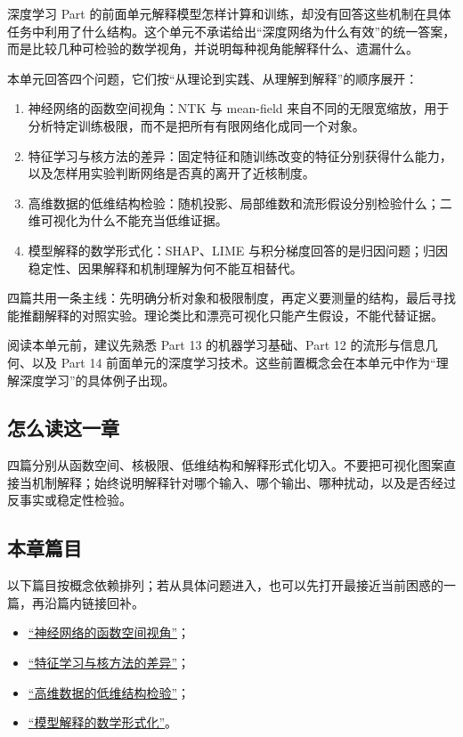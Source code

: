 深度学习 Part 的前面单元解释模型怎样计算和训练，却没有回答这些机制在具体任务中利用了什么结构。这个单元不承诺给出``深度网络为什么有效''的统一答案，而是比较几种可检验的数学视角，并说明每种视角能解释什么、遗漏什么。

本单元回答四个问题，它们按``从理论到实践、从理解到解释''的顺序展开：

\begin{enumerate}
\tightlist
\item
  神经网络的函数空间视角：NTK 与 mean-field 来自不同的无限宽缩放，用于分析特定训练极限，而不是把所有有限网络化成同一个对象。
\item
  特征学习与核方法的差异：固定特征和随训练改变的特征分别获得什么能力，以及怎样用实验判断网络是否真的离开了近核制度。
\item
  高维数据的低维结构检验：随机投影、局部维数和流形假设分别检验什么；二维可视化为什么不能充当低维证据。
\item
  模型解释的数学形式化：SHAP、LIME 与积分梯度回答的是归因问题；归因稳定性、因果解释和机制理解为何不能互相替代。
\end{enumerate}

四篇共用一条主线：先明确分析对象和极限制度，再定义要测量的结构，最后寻找能推翻解释的对照实验。理论类比和漂亮可视化只能产生假设，不能代替证据。

阅读本单元前，建议先熟悉 Part 13 的机器学习基础、Part 12 的流形与信息几何、以及 Part 14 前面单元的深度学习技术。这些前置概念会在本单元中作为``理解深度学习''的具体例子出现。

\subsection{怎么读这一章}

四篇分别从函数空间、核极限、低维结构和解释形式化切入。不要把可视化图案直接当机制解释；始终说明解释针对哪个输入、哪个输出、哪种扰动，以及是否经过反事实或稳定性检验。

\subsection{本章篇目}

以下篇目按概念依赖排列；若从具体问题进入，也可以先打开最接近当前困惑的一篇，再沿篇内链接回补。

\begin{itemize}
\tightlist
\item \hyperref[sec:14-Deep-Learning/07-Interpretability-Mathematics/01]{``神经网络的函数空间视角''}；
\item \hyperref[sec:14-Deep-Learning/07-Interpretability-Mathematics/02]{``特征学习与核方法的差异''}；
\item \hyperref[sec:14-Deep-Learning/07-Interpretability-Mathematics/03]{``高维数据的低维结构检验''}；
\item \hyperref[sec:14-Deep-Learning/07-Interpretability-Mathematics/04]{``模型解释的数学形式化''}。
\end{itemize}
